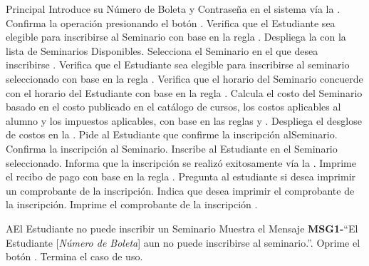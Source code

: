 	\begin{UCtrayectoria}{Principal}
		\UCpaso[\UCactor] Introduce su Número de Boleta y Contraseña en el sistema vía la  \label{CU17Login}.
		\UCpaso[\UCactor] Confirma la operación presionando el botón .
		\UCpaso Verifica que el Estudiante sea elegible para inscribirse al Seminario con base en la regla  .
		\UCpaso Despliega la  con la lista de Seminarios Disponibles.
		\UCpaso[\UCactor] Selecciona el Seminario en el que desea inscribirse \label{CU17SeleccionarSeminario}.
		\UCpaso Verifica que el Estudiante sea elegible para inscribirse al seminario seleccionado con base en la regla  .
		\UCpaso Verifica que el horario del Seminario concuerde con el horario del Estudiante con base en la regla  .
		\UCpaso Calcula el costo del Seminario basado en el costo publicado en el catálogo de cursos, los costos aplicables al alumno y los impuestos aplicables, con base en las reglas  y .
		\UCpaso Despliega el desglose de costos en la .
		\UCpaso Pide al Estudiante que confirme la inscripción alSeminario.
		\UCpaso[\UCactor] Confirma la inscripción al Seminario.
		\UCpaso Inscribe al Estudiante en el Seminario seleccionado.
		\UCpaso Informa que la inscripción se realizó exitosamente vía la . 
		\UCpaso Imprime el recibo de pago con base en la regla .
		\UCpaso Pregunta al estudiante si desea imprimir un comprobante de la inscripción.
		\UCpaso[\UCactor] Indica que desea imprimir el comprobante de la inscripción.
		\UCpaso Imprime el comprobante de la inscripción .		
	\end{UCtrayectoria}

		\begin{UCtrayectoriaA}{A}{El Estudiante no puede inscribir un Seminario}
			\UCpaso Muestra el Mensaje {\bf MSG1-}``El Estudiante [{\em Número de Boleta}] aun no puede inscribirse al seminario.''.
			\UCpaso[\UCactor] Oprime el botón .
			\UCpaso[] Termina el caso de uso.
		\end{UCtrayectoriaA}
		
